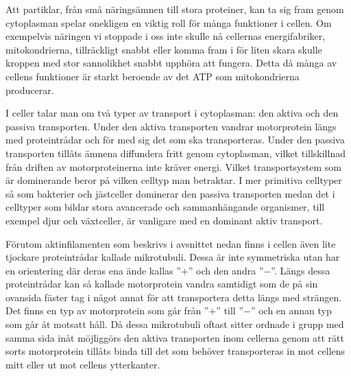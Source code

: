 Att partiklar, från små näringsämnen till stora proteiner, kan ta sig fram genom cytoplasman spelar onekligen en viktig roll för många funktioner i cellen. Om exempelvis näringen vi stoppade i oss inte skulle nå cellernas energifabriker, mitokondrierna, tillräckligt snabbt eller komma fram i för liten skara skulle kroppen med stor sannolikhet snabbt upphöra att fungera. Detta då många av cellens funktioner är starkt beroende av det ATP som mitokondrierna\footnotemark{} producerar.

I celler talar man om två typer av transport i cytoplasman: den aktiva och den passiva transporten. Under den aktiva transporten vandrar motorprotein längs med proteintrådar och för med sig det som ska transporteras. Under den passiva transporten tillåts ämnena diffundera fritt genom cytoplasman, vilket tillskillnad från driften av motorproteinerna inte kräver energi. 
Vilket transportsystem som är dominerande beror på vilken celltyp man betraktar. I mer primitiva celltyper så som bakterier och jästceller dominerar den passiva transporten medan det i celltyper som bildar stora avancerade och sammanhängande organismer, till exempel djur och växtceller, är vanligare med en dominant aktiv transport. 

Förutom aktinfilamenten som beskrivs i avsnittet nedan finns i cellen även lite tjockare proteintrådar kallade mikrotubuli. Dessa är inte symmetriska utan har en orientering där deras ena ände kallas ''$+$'' och den andra ''$-$''. Längs dessa proteintrådar kan så kallade motorprotein vandra samtidigt som de på sin ovansida fäster tag i något annat för att transportera detta längs med strängen. Det finns en typ av motorprotein som går från ''$+$'' till ''$-$'' och en annan typ som går åt motsatt håll. Då dessa mikrotubuli oftast sitter ordnade i grupp med samma sida inåt möjliggörs den aktiva transporten inom cellerna genom att rätt sorts motorprotein tillåts binda till det som behöver transporteras in mot cellens mitt eller ut mot cellens ytterkanter. 


